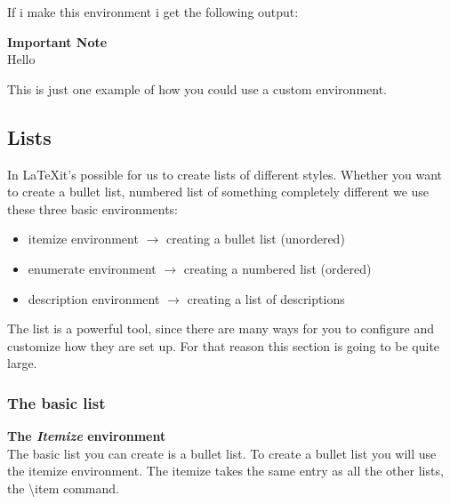 \documentclass{article}
\newenvironment{highlightbox}[1] %
{
    \begin{mdframed}[backgroundcolor=yellow!30, linecolor=orange]
    \textbf{#1} \\
}
{
    \end{mdframed}
}
\newcommand{\jbs}[1]{\textbackslash{}#1} %
\begin{document}
If i make this environment i get the following output:

\begin{highlightbox}{Important Note}
    Hello
\end{highlightbox}

This is just one example of how you could use a custom environment.

\subsection{Lists}
In \LaTeX it's possible for us to create lists of different styles. Whether you want to create a bullet list, numbered list of something completely different 
we use these three basic environments:

\begin{itemize}
    \item itemize environment $\rightarrow$ creating a bullet list (unordered)
    \item enumerate environment $\rightarrow$ creating a numbered list (ordered)
    \item description environment $\rightarrow$ creating a list of descriptions 
\end{itemize}

The list is a powerful tool, since there are many ways for you to configure and customize how they are
set up. For that reason this section is going to be quite large. 

\subsubsection{The basic list}
\textbf{The \textit{Itemize} environment} \\
The basic list you can create is a bullet list. To create a bullet list you will use the itemize environment.
The itemize takes the same entry as all the other lists, the \jbs{item} command.
\end{document}
